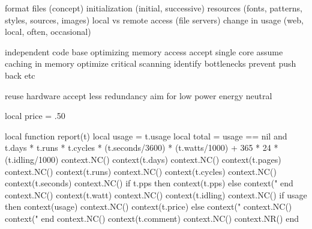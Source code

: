 \stoptitle

\starttitle[title=Running]

\startitemize[packed]
    \startitem format files (concept) \stopitem
    \startitem initialization (initial, successive) \stopitem
    \startitem resources (fonts, patterns, styles, sources, images) \stopitem
    \startitem local vs remote access (file servers) \stopitem
    \startitem change in usage (web, local, often, occasional) \stopitem
\stopitemize

\stoptitle

\starttitle[title=A recent engine]

\startitemize[packed]
    \startitem independent code base \stopitem
    \startitem optimizing memory access \stopitem
    \startitem accept single core \stopitem
    \startitem assume caching in memory \stopitem
    \startitem optimize critical scanning  \stopitem
    \startitem identify bottlenecks \stopitem
    \startitem prevent push back \stopitem
    \startitem etc \stopitem
\stopitemize

\stoptitle

\starttitle[title=Infrastructure]

\startitemize[packed]
    \startitem reuse hardware \stopitem
    \startitem accept less redundancy \stopitem
    \startitem aim for low power \stopitem
    \startitem energy neutral \stopitem
\stopitemize

\stoptitle

\starttitle[title=Calculation]

\start \small

\startluacode

    local price = .50

    local function report(t)
        local usage = t.usage
        local total = usage == nil and t.days * t.runs * t.cycles * (t.seconds/3600) * (t.watts/1000) + 365 * 24 * (t.idling/1000)
        context.NC() context(t.days)
        context.NC() context(t.pages)
        context.NC() context(t.runs)
        context.NC() context(t.cycles)
        context.NC() context(t.seconds)
        context.NC()
        if t.pps then
            context(t.pps)
        else
            context("%
        end
        context.NC() context(t.watt)
        context.NC() context(t.idling)
        context.NC()
        if usage then
            context(usage)
            context.NC()
            context(t.price)
        else
            context("%
            context.NC()
            context("%
        end
        context.NC() context(t.comment)
        context.NC() context.NR()
    end

